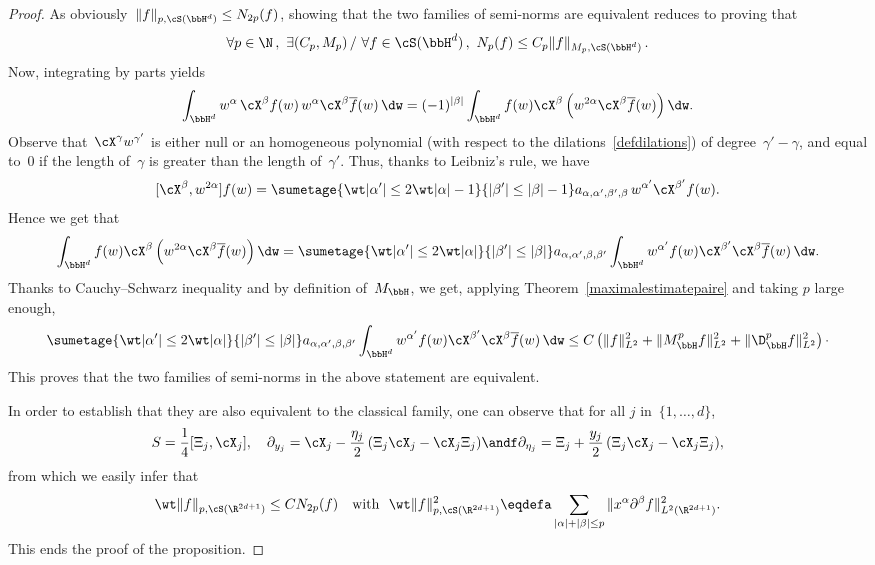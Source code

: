 \begin{proof}
As obviously~$\|f\|_{p,\cS(\bbH^d)}\leq N_{2p} (f)$, showing that the two families of semi-norms are equivalent reduces to proving that
\begin{equation}\label{c:schwartzdemooeq3}
\forall p\in \N\,,\ \exists (C_p,M_p)\,/\ \forall f\in \cS(\bbH^d)\,,\ N_p(f)\leq C_p\|f\|_{M_p,\cS(\bbH^d)} \,.
\end{equation}
Now, integrating by parts yields
\begin{align*}
\int_{\bbH^d} w^\alpha \,\cX^\beta f(w) \,w^\alpha \cX^\beta\overline f(w)\,\dw = (-1)^{|\beta|} \int_{\bbH^d} f(w) \cX^\beta\left(w^{2\alpha} \cX^\beta \overline f(w)\right)\dw.
\end{align*}
Observe that~$\cX^\gamma w^{\gamma'}$ is either null or an homogeneous polynomial (with respect to the dilations~\eqref{defdilations}) of degree~$\gamma'-\gamma$, and equal to~$0$ if the length of~$\gamma$ is greater than the length of~$\gamma'$. Thus, thanks to Leibniz's rule, we have
\begin{equation}\label{c:schwartzdemooeq0}
[\cX^\beta,w^{2\alpha}] f(w) = \sumetage { \wt |\alpha'|\leq 2\wt |\alpha|-1} {|\beta'|\leq|\beta|-1} a_{\alpha,\alpha',\beta',\beta} \,w^{\alpha'} \cX^{\beta'}f(w).
\end{equation}
Hence we get that
\[
\int_{\bbH^d} f(w) \cX^\beta\left(w^{2\alpha} \cX^\beta \overline f(w)\right)\dw =
\sumetage {\wt|\alpha'|\leq 2 \wt |\alpha|} {|\beta'|\leq |\beta|} a_{\alpha,\alpha',\beta,\beta'} \int_{\bbH^d} w^{\alpha'} f(w) \cX^{\beta'} \cX^\beta\overline f(w) \,\dw.
\]
Thanks to Cauchy--Schwarz inequality and by definition of~$M_\bbH$, we get, applying Theorem~\ref{maximalestimatepaire} and taking $p$ large enough,
\[
\sumetage {\wt|\alpha'|\leq 2 \wt |\alpha|} {|\beta'|\leq |\beta|} a_{\alpha,\alpha',\beta,\beta'} \int_{\bbH^d} w^{\alpha'} f(w) \cX^{\beta'} \cX^\beta\overline f(w)\, \dw
\leq C\left(\|f\|_{L^2}^2 + \|M_\bbH^{p} f\|_{L^2} ^2+ \|\D_\bbH^{p} f\|_{L^2}^2\right)\cdotp
\]
This proves that the two families of semi-norms in the above statement are equivalent.

In order to establish that they are also equivalent to the classical family, one can observe that for all $j$ in~$ \{1, \dots,d \}$,
\[
S = \frac 1 4 [\Xi_j,\cX_j],\quad \partial_{y_j}= \cX_j - \frac {\eta_j} 2 \,(\Xi_j\cX_j- \cX_j \Xi_j) \andf \partial_{\eta_j}= \Xi_j+ \frac {y_j} 2 \,(\Xi_j\cX_j- \cX_j \Xi_j),
\]
from which we easily infer that
\[
\wt \|f\|_{p,\cS(\R^{2d+1})}
\leq C N_{2p}(f)
\quad\hbox{with }\ \wt \|f\|_{p,\cS(\R^{2d+1})}^2 \eqdefa \sum_{|\alpha|+|\beta|\leq p} \|x^\alpha \partial^\beta f \|_{L^2(\R^{2d+1})}^2.
\]
This ends the proof of the proposition.
\end{proof}

